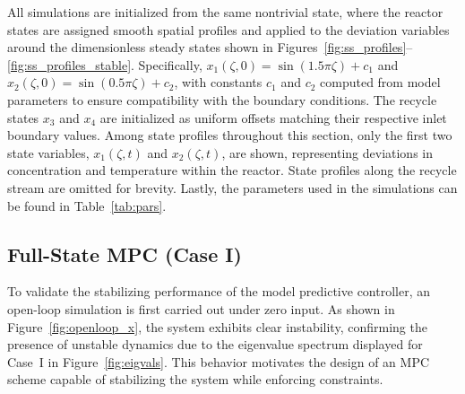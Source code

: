 All simulations are initialized from the same nontrivial state, where the reactor states are assigned smooth spatial profiles and applied to the deviation variables around the dimensionless steady states shown in Figures~\ref{fig:ss_profiles}--\ref{fig:ss_profiles_stable}. Specifically, $x_1(\zeta, 0) = \sin(1.5\pi \zeta) + c_1$ and $x_2(\zeta, 0) = \sin(0.5\pi \zeta) + c_2$, with constants $c_1$ and $c_2$ computed from model parameters to ensure compatibility with the boundary conditions. The recycle states $x_3$ and $x_4$ are initialized as uniform offsets matching their respective inlet boundary values. Among state profiles throughout this section, only the first two state variables, $x_1(\zeta, t)$ and $x_2(\zeta, t)$, are shown, representing deviations in concentration and temperature within the reactor. State profiles along the recycle stream are omitted for brevity. Lastly, the parameters used in the simulations can be found in Table~\ref{tab:pars}.


\subsection{Full-State MPC (Case I)}

To validate the stabilizing performance of the model predictive controller, an open-loop simulation is first carried out under zero input. As shown in Figure~\ref{fig:openloop_x}, the system exhibits clear instability, confirming the presence of unstable dynamics due to the eigenvalue spectrum displayed for Case~I in Figure~\ref{fig:eigvals}. This behavior motivates the design of an MPC scheme capable of stabilizing the system while enforcing constraints.

